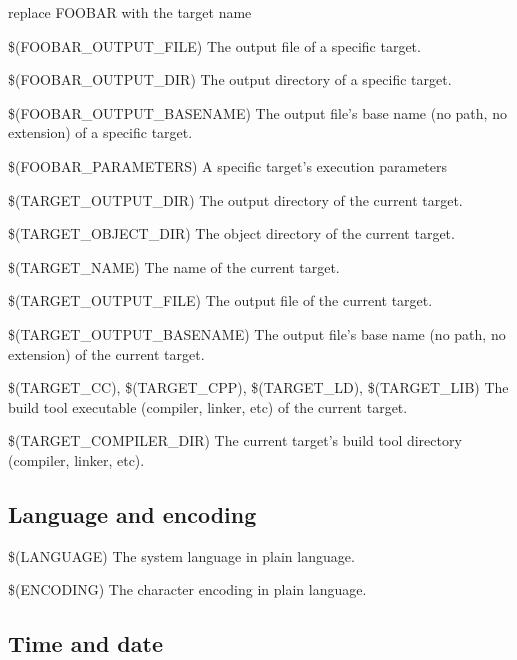 replace FOOBAR with the target name 

\begin{codeentry}
\item[\$(FOOBAR\_OUTPUT\_FILE)] The output file of a specific target.
\item[\$(FOOBAR\_OUTPUT\_DIR)] The output directory of a specific target.
\item[\$(FOOBAR\_OUTPUT\_BASENAME)] The output file's base name (no path, no extension) of a specific target.
\item[\$(FOOBAR\_PARAMETERS)] A specific target's execution parameters
\item[\$(TARGET\_OUTPUT\_DIR)] The output directory of the current target.
\item[\$(TARGET\_OBJECT\_DIR)] The object directory of the current target.
\item[\$(TARGET\_NAME)] The name of the current target.
\item[\$(TARGET\_OUTPUT\_FILE)] The output file of the current target.
\item[\$(TARGET\_OUTPUT\_BASENAME)] The output file's base name (no path, no extension) of the current target.
\item[\$(TARGET\_CC), \$(TARGET\_CPP), \$(TARGET\_LD), \$(TARGET\_LIB)] The build tool executable (compiler, linker, etc) of the current target.
\item[\$(TARGET\_COMPILER\_DIR)] The current target's build tool directory (compiler, linker, etc).
\end{codeentry}

\subsection{Language and encoding}

\begin{codeentry}
\item[\$(LANGUAGE)] The system language in plain language.
\item[\$(ENCODING)] The character encoding in plain language.
\end{codeentry}

\subsection{Time and date}

